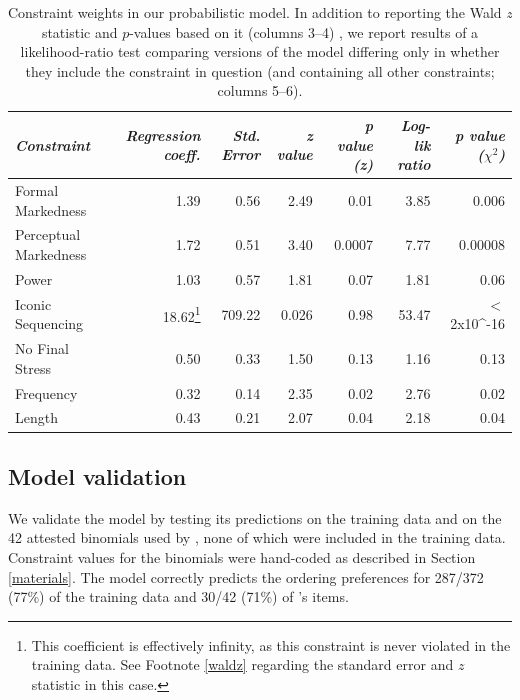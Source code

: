 \documentclass[authoryear]{elsarticle}
\begin{document}
\begin{table}[t]
\begin{minipage}[t]{\textwidth}


\renewcommand*\footnoterule{}


\centering
\begin{tabular}{ l  r  r  r  r r r }
\hline\hline
\emph{Constraint} & \emph{Regression coeff.} &\emph{Std. Error} & \emph{z value} & \emph{p value (z)} & \emph{Log-lik ratio} & \emph{p value ($\chi^{2}$)}\\\hline    
 Formal Markedness   & 1.39     & 0.56   & 2.49  & 0.01 & 3.85 & 0.006  \\ 
Perceptual Markedness   & 1.72     & 0.51  &  3.40 &  0.0007& 7.77 & 0.00008    \\ 
 Power &     1.03 &     0.57&    1.81 &  0.07& 1.81 & 0.06     \\
Iconic Sequencing  &    18.62\footnote{This coefficient is effectively infinity, as this constraint is never violated in the training data. See Footnote \ref{waldz} regarding the standard error and $z$ statistic in this case.} &   709.22  &  0.026 &  0.98&   53.47 & $<$2x10^{-16}    \\
 No Final Stress   &    0.50   &   0.33 &   1.50&   0.13 & 1.16 & 0.13      \\
 Frequency   &    0.32    &  0.14 &   2.35  & 0.02& 2.76 & 0.02     \\  
 Length  &    0.43  &    0.21 &   2.07 &  0.04& 2.18  & 0.04    \\  \hline
\end{tabular}
\end{minipage}
\caption{Constraint weights in our probabilistic model. In addition to reporting the Wald \emph{z} statistic and $p$-values based on it (columns 3--4) , we report results of a likelihood-ratio test comparing versions of the model differing only in whether they include the constraint in question (and containing all other constraints; columns 5--6).}\label{t:weights}

\end{table} 


\subsection{Model validation}\label{validation}
We validate the model by testing its predictions on the training data and on the 42 attested binomials used by \citet{SiyanovaChanturia:2011ep}, none of which were included in the training data. Constraint values for the \citeauthor{SiyanovaChanturia:2011ep} binomials were hand-coded as described in Section \ref{materials}. The model correctly predicts the ordering preferences for 287/372 (77\%) of the training data and 30/42 (71\%) of \citeauthor{SiyanovaChanturia:2011ep}'s items.
\end{document}
